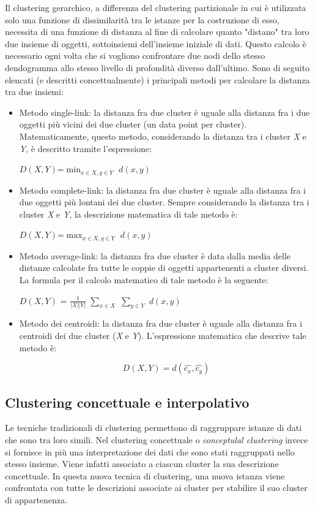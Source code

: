 \documentclass[12pt,a4paper,twoside,openright]{book}
\begin{document}
Il clustering gerarchico, a differenza del clustering partizionale in cui è utilizzata solo una funzione di dissimilarità tra le istanze per la costruzione di esso, necessita di una funzione di distanza al fine di calcolare quanto "distano" tra loro due insieme di oggetti, sottoinsiemi dell'insieme iniziale di dati. Questo calcolo è necessario ogni volta che si vogliono confrontare due nodi dello stesso dendogramma allo stesso livello di profondità diverso dall’ultimo. Sono di seguito elencati (e descritti concettualmente) i principali metodi per calcolare la distanza tra due insiemi:
\begin{itemize}
\item Metodo single-link: la distanza fra due cluster è uguale alla distanza fra i due oggetti più vicini dei due cluster (un data point per cluster). Matematicamente, questo metodo, considerando la distanza tra i cluster \textit{X} e \textit{Y}, è descritto tramite l'espressione:
\begin{center}
$D(X,Y)$=$\min_{x\in X, y\in Y}$ $d(x,y)$
\end{center}
\item Metodo complete-link: la distanza fra due cluster è uguale alla distanza fra i due oggetti più lontani dei due cluster. Sempre considerando la distanza tra i cluster \textit{X} e \textit{Y}, la descrizione matematica di tale metodo è:
\begin{center}
$D(X,Y)$=$\max_{x\in X, y\in Y}$ $d(x,y)$
\end{center}
\item Metodo average-link: la distanza fra due cluster è data dalla media delle distanze calcolate fra tutte le coppie di oggetti appartenenti a cluster diversi. La formula per il calcolo matematico di tale metodo è la seguente:
\begin{center}
$D(X,Y)$ = $\frac{1}{|X| |Y|}$ $\sum_{x \in X }$ $\sum_{ y \in Y}$ $d(x,y)$
\end{center}
\item Metodo dei centroidi: la distanza fra due cluster è uguale alla distanza fra i centroidi dei due cluster (\textit{X} e \textit{Y}). L'espressione matematica che descrive tale metodo è:
\begin{center}
$$D(X,Y) = d(\hat{c_x}, \hat{c_y})$$
\end{center}
\end{itemize}
\subsection{Clustering concettuale e interpolativo}
Le tecniche tradizionali di clustering permettono di raggruppare istanze di dati che sono tra loro simili. Nel clustering concettuale o \textit{conceptulal clustering} \cite {19a} invece si fornisce in più una interpretazione dei dati che sono stati raggruppati nello stesso insieme. Viene infatti associato a ciascun cluster la sua descrizione concettuale. In questa nuova tecnica di clustering, una nuova istanza viene confrontata con tutte le descrizioni associate ai cluster per stabilire il suo cluster di appartenenza.
\end{document}
